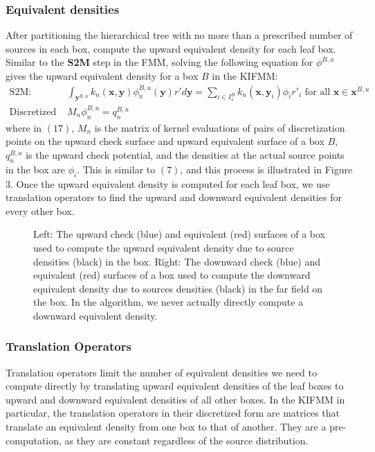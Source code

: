 \documentclass[11pt, oneside]{article}   	%
\begin{document}
\subsubsection{Equivalent densities}
After partitioning the hierarchical tree with no more than a prescribed number of sources in each box, compute the upward equivalent density for each leaf box. Similar to the \textbf{S2M} step in the FMM, solving the following equation for $\phi^{B,u}$ gives the upward equivalent density for a box $B$ in the KIFMM:
\begin{align}
\mbox{S2M: }&\int_{\mathbf{y}^{B,u}}{k_n(\mathbf{x},\mathbf{y})}\phi^{B,u}_n{(\mathbf{y})}r'd\mathbf{y}=\sum\limits_{i\in I_s^B} k_n(\mathbf{x},\mathbf{y}_i)\phi_ir'_i\mbox{ for all }\mathbf{x}\in\mathbf{x}^{B,u}\\
\mbox{Discretized S2M: }&M_n\phi^{B,u}_n=q_n^{B,u}
\end{align}
where in $(17)$, $M_n$ is the matrix of kernel evaluations of pairs of discretization points on the upward check surface and upward equivalent surface of a box $B$, $q_n^{B,u}$ is the upward check potential, and the densities at the actual source points in the box are $\phi_i$. This is similar to $(7)$, and this process is illustrated in Figure 3. Once the upward equivalent density is computed for each leaf box, we use translation operators to find the upward and downward equivalent densities for every other box.

\begin{figure}[!ht]
\begin{center}
\end{center}
\caption{Left: The upward check (blue) and equivalent (red) surfaces of a box used to compute the upward equivalent density due to source densities (black) in the box. Right: The downward check (blue) and equivalent (red) surfaces of a box used to compute the downward equivalent density due to sources densities (black) in the far field on the box. In the algorithm, we never actually directly compute a downward equivalent density.}
\end{figure}

\subsubsection{Translation Operators}

Translation operators limit the number of equivalent densities we need to compute directly by translating upward equivalent densities of the leaf boxes to upward and downward equivalent densities of all other boxes. In the KIFMM in particular, the translation operators in their discretized form are matrices that translate an equivalent density from one box to that of another. They are a pre-computation, as they are constant regardless of the source distribution.
\end{document}
